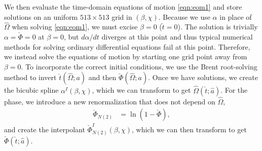 \documentclass[%
 reprint,
 nofootinbib,
 amsmath,amssymb,
 aps,
 prd,
]{revtex4-2}
\begin{document}

We then evaluate the time-domain equations of motion \eqref{eqn:eom1} and store solutions on an uniform $513 \times 513$ grid in $(\beta, \chi)$. Because we use $\alpha$ in place of $\hat{\Omega}$ when solving \eqref{eqn:eom1}, we must excise $\beta = 0$ ($\check{t} = 0$). The solution is trivially $\alpha = \check{\Phi} = 0$ at $\beta = 0$, but $d\alpha/dt$ diverges at this point and thus typical numerical methods for solving ordinary differential equations fail at this point. Therefore, we instead solve the equations of motion by starting one grid point away from $\beta = 0$. To incorporate the correct initial conditions, we use the Brent root-solving method to invert $\check{t}(\hat{\Omega}; a)$ and then $\check{\Phi}(\hat{\Omega}; a)$. Once we have solutions, we create the bicubic spline $\alpha^I(\beta, \chi)$, which we can transform to get $\hat{\Omega}(\check{t}; \hat{a})$. For the phase, we introduce a new renormalization that does not depend on $\hat{\Omega}$,
\begin{align} \label{eqn:phaseNorm2}
    \check{\Phi}_{N(2)} &= \ln\left(1 - \check{\Phi} \right),
\end{align}
and create the interpolant $\check{\Phi}_{N(2)}^I(\beta, \chi)$, which we can then transform to get $\check{\Phi}(\check{t}; \hat{a})$.
\end{document}
